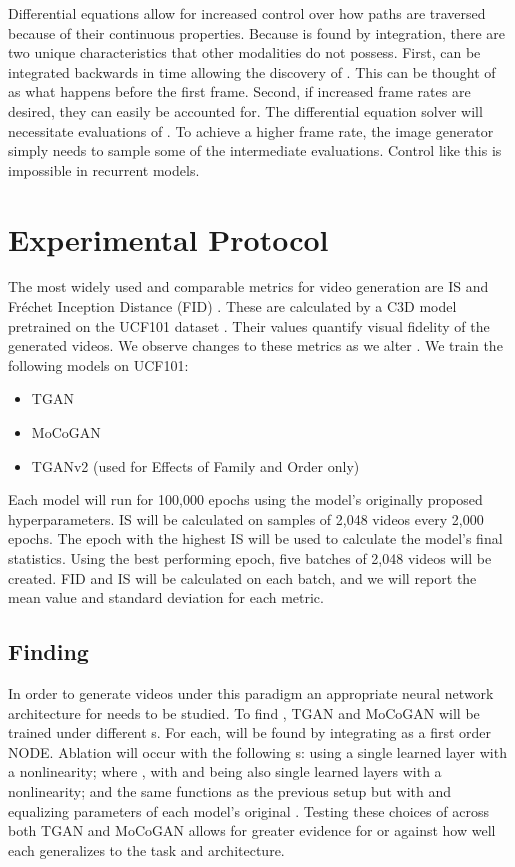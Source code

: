 \documentclass[tablecaption=bottom,pmlr]{jmlr}
\begin{document}
Differential equations allow for increased control over how paths are traversed because of their continuous properties. Because  is found by integration, there are two unique characteristics that other modalities do not possess. First,  can be integrated backwards in time allowing the discovery of . This can be thought of as what happens before the first frame. Second, if increased frame rates are desired, they can easily be accounted for. The differential equation solver will necessitate evaluations of . To achieve a higher frame rate, the image generator simply needs to sample some of the intermediate  evaluations. Control like this is impossible in recurrent models.



\section{Experimental Protocol}

The most widely used and comparable metrics for video generation are IS and Fr\'echet Inception Distance (FID) \citep{ttur}. These are calculated by a C3D model \citep{c3d} pretrained on the UCF101 dataset \citep{ucf101}.
Their values quantify visual fidelity of the generated videos. We observe changes to these metrics as we alter . We train the following models on UCF101:
\begin{itemize}
    \item TGAN
    \item MoCoGAN
    \item TGANv2 (used for Effects of Family and Order only)
\end{itemize}

Each model will run for 100,000 epochs using the model's originally proposed hyperparameters. IS will be calculated on samples of 2,048 videos every 2,000 epochs. The epoch with the highest IS will be used to calculate the model's final statistics. Using the best performing epoch, five batches of 2,048 videos will be created. FID and IS will be calculated on each batch, and we will report the mean value and standard deviation for each metric.


\subsection[Finding f(x)]{Finding }

In order to generate videos under this paradigm an appropriate neural network architecture for  needs to be studied. To find , TGAN and MoCoGAN will be trained under different s. For each,  will be found by integrating  as a first order NODE. Ablation will occur with the following s:  using a single learned layer with a nonlinearity;  where , with 
and  being also single learned layers with a nonlinearity; and the same functions as the previous setup but with  and  equalizing parameters of each model's original . Testing these choices of 
across both TGAN and MoCoGAN allows for greater evidence for or against how well each  generalizes to the task and architecture.
\end{document}
